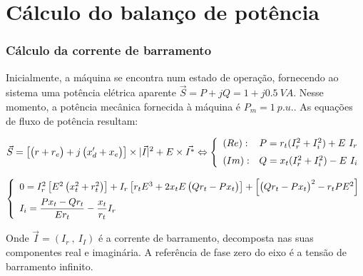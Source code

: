 \documentclass[10pt, compress,xcolor={svgnames,dvipsnames,x11names}]{beamer}
\begin{document}
\section{Cálculo do balanço de potência}%
\begin{frame}%
\frametitle{Cálculo da corrente de barramento}
\scriptsize

	Inicialmente, a máquina se encontra num estado de operação, fornecendo ao sistema uma potência elétrica aparente $\vec{S} = P + jQ = 1 + j0.5 \ VA$. Nesse momento, a potência mecânica fornecida à máquina é $P_m = 1\ p.u.$. As equações de fluxo de potência resultam:

\begin{equation}
\vec{S} = \left[\left(\strut r + r_e\right) + j\left(\strut x'_d + x_e\right)\right]\times | \vec{I} |^2 + E\times \vec{I^{*}} \Leftrightarrow
%
\left\{ \begin{array}{ll}
\left(Re\right): & P = r_t(I_r^2 + I_i^2) + E\ I_r \label{eq:inicial1}\\[2mm]
%
\left(Im\right): & Q = x_t(I_r^2 + I_i^2) - E\ I_i 
\end{array} \right.
\end{equation}

\begin{gather}
\left\{ \begin{array}{l}
0 = I_r^2 \left[E^2\left(\strut x_t^2 + r_t^2\right)\right] + I_r \left[ r_tE^3 + 2x_tE\left(\strut Qr_t - Px_t \right)\right] + \left[\left(\strut Qr_t - Px_t \right) ^2 -r_tPE^2\right]\\[2mm]
%
I_i = \dfrac{Px_t - Qr_t}{Er_t} - \dfrac{x_t}{r_t}I_r
\end{array}  \right.\label{sis::sistemaPontoDeOperacaoCorrentes} 
\end{gather}

	Onde $\vec{I} = \left( I_r\ ,\ I_I\right)$ é a corrente de barramento, decomposta nas suas componentes real e imaginária. A referência de fase zero do eixo é a tensão de barramento infinito. 

\normalsize
\end{frame}%
\end{document}
